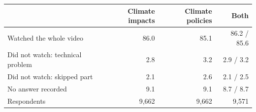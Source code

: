 \begin{tabular}{lrrr}
\toprule
 & Climate impacts & Climate policies & Both \\
\midrule
Watched the whole video & 86.0 & 85.1 & 86.2 / 85.6 \\
Did not watch: technical problem & 2.8 & 3.2 & 2.9 / 3.2 \\
Did not watch: skipped part & 2.1 & 2.6 & 2.1 / 2.5 \\
No answer recorded & 9.1 & 9.1 & 8.7 / 8.7 \\
\addlinespace
Respondents & 9,662 & 9,662 & 9,571 \\
\bottomrule
\end{tabular}
